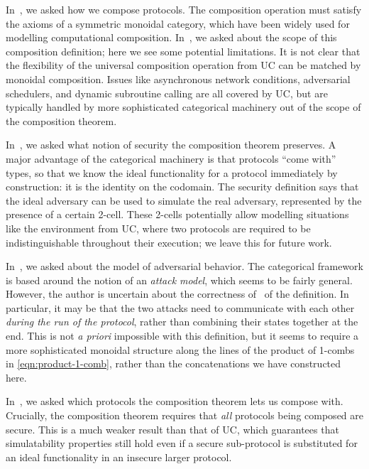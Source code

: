 In~, we asked how we compose protocols. The
composition operation must satisfy the axioms of a symmetric monoidal category,
which have been widely used for modelling computational composition.
In~, we asked about the scope of this
composition definition; here we see some potential limitations. It is not clear
that the flexibility of the universal composition operation from UC can be
matched by monoidal composition. Issues like asynchronous network conditions,
adversarial schedulers, and dynamic subroutine calling are all covered by
UC, but are typically handled by more sophisticated categorical machinery out of
the scope of the composition theorem.

In~, we asked what notion of security the
composition theorem preserves. A major advantage of the categorical machinery is
that protocols ``come with'' types, so that we know the ideal functionality for
a protocol immediately by construction: it is the identity on the codomain. The
security definition says that the ideal adversary can be used to simulate the
real adversary, represented by the presence of a certain 2-cell. These 2-cells
potentially allow modelling situations like the environment from UC, where two
protocols are required to be indistinguishable throughout their execution; we
leave this for future work.

In~, we asked about the model of adversarial
behavior. The categorical framework is based around the notion of an
\emph{attack model}, which seems to be fairly general. However, the author is
uncertain about the correctness of~ of the
definition. In particular, it may be that the two attacks need to communicate
with each other \emph{during the run of the protocol}, rather than combining
their states together at the end. This is not \emph{a priori} impossible with
this definition, but it seems to require a more sophisticated monoidal structure
along the lines of the product of 1-combs in
\eqref{eqn:product-1-comb}, rather than the concatenations we
have constructed here.

In~, we asked which protocols the composition
theorem lets us compose with. Crucially, the composition theorem requires that
\emph{all} protocols being composed are secure. This is a much weaker result
than that of UC, which guarantees that simulatability properties still hold even
if a secure sub-protocol is substituted for an ideal functionality in an
insecure larger protocol.

